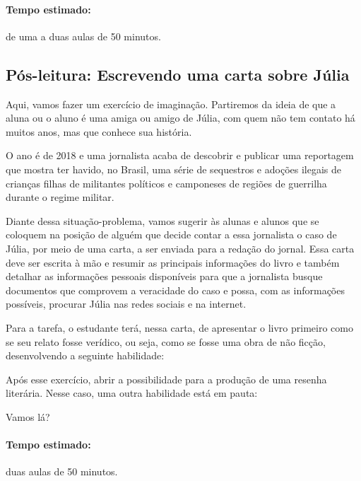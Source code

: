 \documentclass[12pt]{extarticle}
\begin{document}
\paragraph{Tempo estimado:} de uma a duas aulas de 50 minutos.

\subsection{Pós-leitura: Escrevendo uma carta sobre Júlia}

Aqui, vamos fazer um exercício de imaginação. Partiremos da ideia de que
a aluna ou o aluno é uma amiga ou amigo de Júlia, com quem não tem
contato há muitos anos, mas que conhece sua história.

O ano é de 2018 e uma jornalista acaba de descobrir e publicar uma
reportagem que mostra ter havido, no Brasil, uma série de sequestros e
adoções ilegais de crianças filhas de militantes políticos e camponeses
de regiões de guerrilha durante o regime militar.

Diante dessa situação-problema, vamos sugerir às alunas e alunos que se
coloquem na posição de alguém que decide contar a essa jornalista o caso
de Júlia, por meio de uma carta, a ser enviada para a redação do jornal.
Essa carta deve ser escrita à mão e resumir as principais informações do
livro e também detalhar as informações pessoais disponíveis para que a
jornalista busque documentos que comprovem a veracidade do caso e possa,
com as informações possíveis, procurar Júlia nas redes sociais e na
internet.

Para a tarefa, o estudante terá, nessa carta, de apresentar o livro primeiro como se seu relato fosse verídico, ou seja, como se fosse uma obra de não ficção, desenvolvendo a seguinte habilidade:


Após esse exercício, abrir a possibilidade para a produção de uma resenha literária. Nesse caso, uma outra habilidade está em pauta:


Vamos lá?

\paragraph{Tempo estimado:} duas aulas de 50 minutos.



\end{document}
